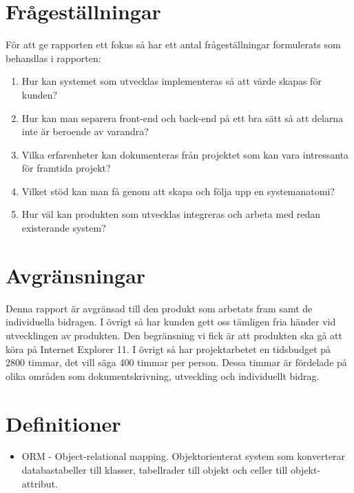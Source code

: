 \section{Frågeställningar}
För att ge rapporten ett fokus så har ett antal frågeställningar formulerats som behandlas i rapporten:
\begin{enumerate}
	\item Hur kan systemet som utvecklas implementeras så att värde skapas för kunden?
	\item Hur kan man separera front-end och back-end på ett bra sätt så att delarna inte är beroende av varandra?
	\item Vilka erfarenheter kan dokumenteras från projektet som kan vara intressanta för framtida projekt?
	\item Vilket stöd kan man få genom att skapa och följa upp en systemanatomi?
	\item Hur väl kan produkten som utvecklas integreras och arbeta med redan existerande system? 
\end{enumerate}

\section{Avgränsningar}
Denna rapport är avgränsad till den produkt som arbetats fram samt de individuella bidragen. I övrigt så har kunden gett oss tämligen fria händer vid utvecklingen av produkten. Den begränsning vi fick är att produkten ska gå att köra på Internet Explorer 11.
I övrigt så har projektarbetet en tidsbudget på 2800 timmar, det vill säga 400 timmar per person. Dessa timmar är fördelade på olika områden som dokumentskrivning, utveckling och individuellt bidrag.

\section{Definitioner}

\begin{itemize}

\item ORM - Object-relational mapping. Objektorienterat system som konverterar databastabeller till klasser, tabellrader till objekt och celler till objekt-attribut.

\end{itemize}

\newpage
